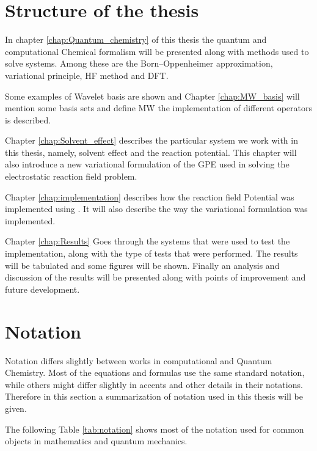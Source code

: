 \documentclass[../Thesis.tex]{subfiles}
\begin{document}
\section{Structure of the thesis}
In chapter \ref{chap:Quantum_chemistry} of this thesis the quantum
and computational Chemical formalism will be presented along with  methods used
to solve systems. Among these are the Born--Oppenheimer approximation, variational principle, \ac{HF} method and
\ac{DFT}.

Some examples of Wavelet basis are shown and Chapter \ref{chap:MW_basis} will mention some basis sets and define \ac{MW}
the implementation of different operators is described.

Chapter \ref{chap:Solvent_effect}
describes the particular system we work with in this thesis, namely, solvent
effect and the reaction potential. This chapter will also introduce a new variational
formulation of the \ac{GPE} used in solving the electrostatic reaction field problem.

Chapter \ref{chap:implementation} describes how the reaction field Potential was implemented
using \mrchem. It will also describe the way the variational formulation was implemented.

Chapter \ref{chap:Results} Goes through the systems that were used to test the implementation,
along with the type of tests that were performed. The results will be tabulated and
some figures will be shown. Finally an analysis and discussion of the results will be
presented along with points of improvement and future development.
\section{Notation}
Notation differs slightly between works in computational and Quantum Chemistry.
Most of the equations and formulas use the same standard notation, while others
might differ slightly in accents and other details in their notations. Therefore
in this section a summarization of notation used in this thesis will be given.

The following Table \ref{tab:notation} shows most of the notation used for
common objects in mathematics and quantum mechanics.
\end{document}
